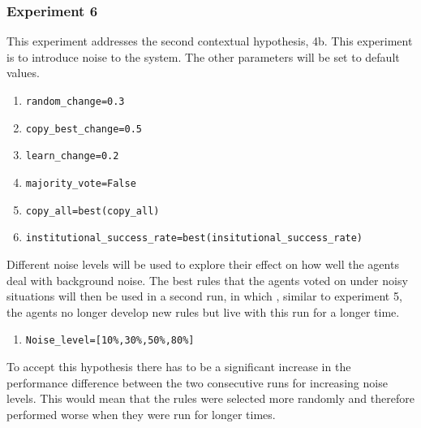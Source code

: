 \documentclass[a4paper]{article}
\begin{document}
\subsubsection{Experiment 6}
This experiment addresses the second contextual hypothesis, 4b. This experiment is to introduce noise to the system. 
The other parameters will be set to default values.

\begin{enumerate}
 \item \begin{alltt}random_change  = 0.3 \end{alltt}
 \item \begin{alltt}copy_best_change = 0.5\end{alltt}
 \item \begin{alltt}learn_change = 0.2\end{alltt}
 \item \begin{alltt}majority_vote = False\end{alltt}
 \item \begin{alltt}copy_all = best(copy_all)\end{alltt}
 \item \begin{alltt}institutional_success_rate = best(insitutional_success_rate)\end{alltt}
\end{enumerate}

Different noise levels will be used to explore their effect on how well the agents deal with background noise.
The best rules that the agents voted on under noisy situations will then be used in a second run, in which ,
similar to experiment 5, the agents no longer develop new rules but live with this run  for a longer time. 
\begin{enumerate}
 \item \begin{alltt}Noise_level = [10\%, 30\% , 50 \%, 80\%] \end{alltt}
\end{enumerate}


To accept this hypothesis there has to be a significant increase in the performance 
difference between the two consecutive runs for increasing noise levels. This would mean that the 
rules were selected more randomly and therefore performed worse when they were run for longer times.
\end{document}

